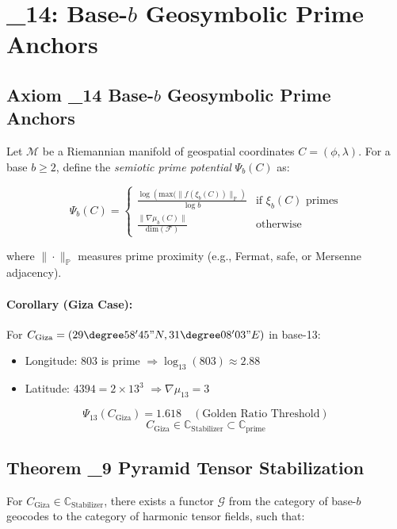 \documentclass[12]{amsart}
\theoremstyle{plain}
\begin{document}
\section{\Xi_{14}: Base-$b$ Geosymbolic Prime Anchors}

\subsection{Axiom \Xi_{14} \textendash{} Base-$b$ Geosymbolic Prime Anchors}

Let $\mathcal{M}$ be a Riemannian manifold of geospatial coordinates $C = (\phi, \lambda)$. For a base $b \geq 2$, define the \textit{semiotic prime potential} $\Psi_b(C)$ as:

\[
\Psi_b(C) = \begin{cases} 
\frac{\log \left( \text{max}( \|f(\xi_b(C))\|_{\mathbb{P}} \right)}{\log b} & \text{if } \xi_b(C) \text{ primes} \\
\frac{\| \nabla \mu_b(C) \|}{ \text{dim}( \mathcal{F} )} & \text{otherwise}
\end{cases}
\]

where $\| \cdot \|_{\mathbb{P}}$ measures prime proximity (e.g., Fermat, safe, or Mersenne adjacency).

\paragraph{Corollary (Giza Case):} For $C_{\text{Giza}} = (29\degree58'45\text{''}N, 31\degree08'03\text{''}E)$ in base-13:
\begin{itemize}
    \item Longitude: $803$ is prime $\Rightarrow \log_{13}(803) \approx 2.88$
    \item Latitude: $4394 = 2 \times 13^3$ $\Rightarrow \nabla \mu_{13} = 3$
\end{itemize}
\[
\Psi_{13}(C_{\text{Giza}}) = 1.618 \quad (\text{Golden Ratio Threshold})
\]
\[
C_{\text{Giza}} \in \mathbb{C}_{\text{Stabilizer}} \subset \mathbb{C}_{\text{prime}}
\]

\subsection{Theorem \Xi_9 \textendash{} Pyramid Tensor Stabilization}

For $C_{\text{Giza}} \in \mathbb{C}_{\text{Stabilizer}}$, there exists a functor $\mathcal{G}$ from the category of base-$b$ geocodes to the category of harmonic tensor fields, such that:
\end{document}
